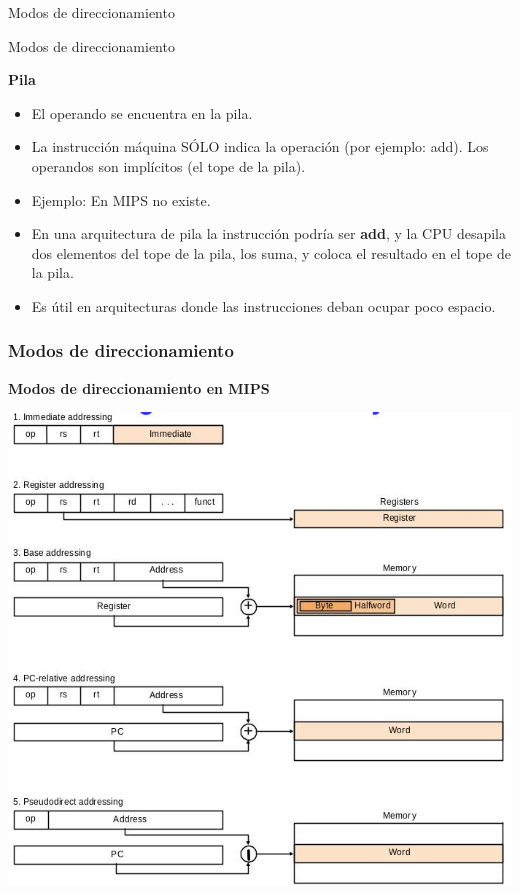 \documentclass[aspectratio=169,compress]{beamer}
\begin{document}
\begin{footnotesize}
\begin{frame}{Modos de direccionamiento}
\begin{itemize}
\end{itemize}

\end{frame}

\begin{frame}{Modos de direccionamiento}
\begin{center}\textbf{Pila}\end{center}

\begin{itemize}
\item El operando se encuentra en la pila.
\item La instrucción máquina SÓLO indica la operación (por ejemplo: add). Los operandos son implícitos (el tope de la pila).
\item Ejemplo: En MIPS no existe. 
\item En una arquitectura de pila la instrucción podría ser \textbf{add}, y la CPU desapila dos elementos del tope de la pila, los suma, y coloca el resultado en el tope de la pila.
\item Es útil en arquitecturas donde las instrucciones deban ocupar poco espacio.

\end{itemize}

\end{frame}




\begin{frame}[fragile]
\frametitle{Modos de direccionamiento}
\begin{center}\textbf{Modos de direccionamiento en MIPS}\end{center}
	\begin{center}
\includegraphics[scale=0.3]{images/modos-de-direccionamiento.jpg} 
	\end{center}
\end{frame}




\end{footnotesize}
\end{document}
